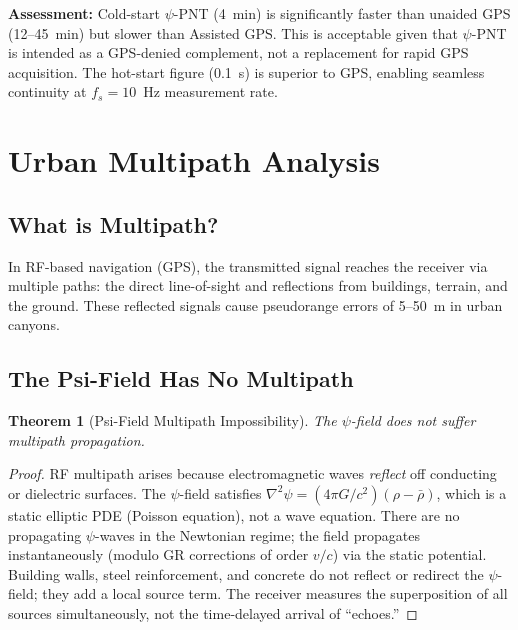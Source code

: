 \documentclass[aps,prd,twocolumn,superscriptaddress,nofootinbib]{revtex4-2}
\newtheorem{theorem}{Theorem}
\begin{document}
\textbf{Assessment:} Cold-start $\psi$-PNT (4~min) is significantly
faster than unaided GPS (12--45~min) but slower than Assisted GPS.
This is acceptable given that $\psi$-PNT is intended as a GPS-denied
complement, not a replacement for rapid GPS acquisition.  The hot-start
figure (0.1~s) is superior to GPS, enabling seamless continuity at
$f_s = 10$~Hz measurement rate.

\section{Urban Multipath Analysis}
\label{sec:multipath}

\subsection{What is Multipath?}

In RF-based navigation (GPS), the transmitted signal reaches the
receiver via multiple paths: the direct line-of-sight and
reflections from buildings, terrain, and the ground.  These reflected
signals cause pseudorange errors of 5--50~m in urban canyons.

\subsection{The Psi-Field Has No Multipath}

\begin{theorem}[Psi-Field Multipath Impossibility]
\label{thm:no-multipath}
The $\psi$-field does not suffer multipath propagation.
\end{theorem}

\begin{proof}
RF multipath arises because electromagnetic waves \emph{reflect} off
conducting or dielectric surfaces.  The $\psi$-field satisfies
$\nabla^2\psi = (4\pi G/c^2)(\rho - \bar\rho)$, which is a static
elliptic PDE (Poisson equation), not a wave equation.  There are no
propagating $\psi$-waves in the Newtonian regime; the field propagates
instantaneously (modulo GR corrections of order $v/c$) via the static
potential.  Building walls, steel reinforcement, and concrete do not
reflect or redirect the $\psi$-field; they add a local source term.
The receiver measures the superposition of all sources simultaneously,
not the time-delayed arrival of ``echoes.''
\end{proof}
\end{document}
